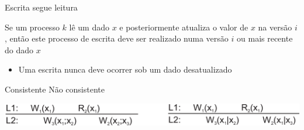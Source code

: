 \documentclass[compress]{beamer}
\begin{document}

\begin{frame}{Escrita segue leitura}

Se um processo $k$ lê um dado $x$ e posteriormente atualiza o valor de $x$ na versão $i$, então este processo de escrita deve ser realizado numa versão $i$ ou mais recente do dado $x$
\begin{itemize}
    \item Uma escrita nunca deve ocorrer sob um dado desatualizado
\end{itemize}

\vspace{1cm}

\centering 

Consistente \hspace{4cm} Não consistente

\vspace{.15cm}

\centering \includegraphics[width=\textwidth]{images/writeFollowRead.png}

\end{frame}
\end{document}
